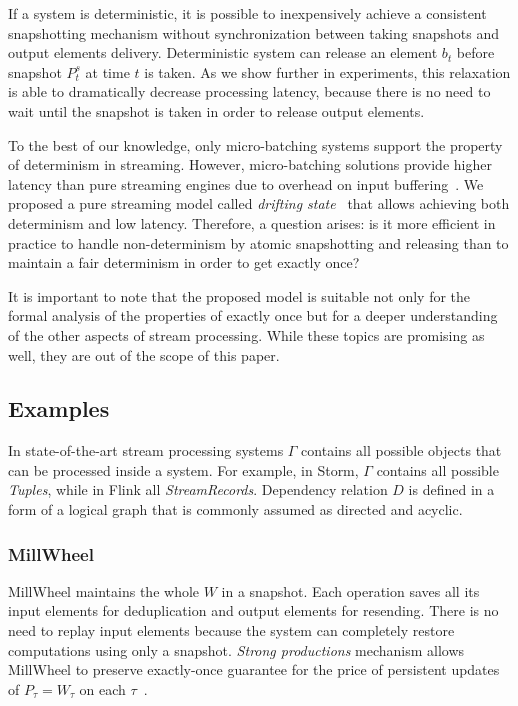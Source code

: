 If a system is deterministic, it is possible to inexpensively achieve a consistent snapshotting mechanism without synchronization between taking snapshots and output elements delivery. Deterministic system can release an element $b_t$ before snapshot $P^{s}_t$ at time $t$ is taken. As we show further in experiments, this relaxation is able to dramatically decrease processing latency, because there is no need to wait until the snapshot is taken in order to release output elements.

To the best of our knowledge, only micro-batching systems support the property of determinism in streaming. However, micro-batching solutions provide higher latency than pure streaming engines due to overhead on input buffering~\cite{karimov2018benchmarking}. We proposed a pure streaming model called {\em drifting state}~\cite{we2018adbis} that allows achieving both determinism and low latency. Therefore, a question arises: is it more efficient in practice to handle non-determinism by atomic snapshotting and releasing than to maintain a fair determinism in order to get exactly once? 

It is important to note that the proposed model is suitable not only for the formal analysis of the properties of exactly once but for a deeper understanding of the other aspects of stream processing. While these topics are promising as well, they are out of the scope of this paper. 

\subsection{Examples}

In state-of-the-art stream processing systems $\Gamma$ contains all possible objects that can be processed inside a system. For example, in Storm, $\Gamma$ contains all possible {\em Tuples}, while in Flink all {\em StreamRecords}. Dependency relation $D$ is defined in a form of a logical graph that is commonly assumed as directed and acyclic.

\subsubsection{MillWheel}

MillWheel maintains the whole $W$ in a snapshot. Each operation saves all its input elements for deduplication and output elements for resending. There is no need to replay input elements because the system can completely restore computations using only a snapshot. {\em Strong productions} mechanism allows MillWheel to preserve exactly-once guarantee for the price of persistent updates of $P_\tau=W_\tau$ on each $\tau$~\cite{Akidau:2013:MFS:2536222.2536229}.    

